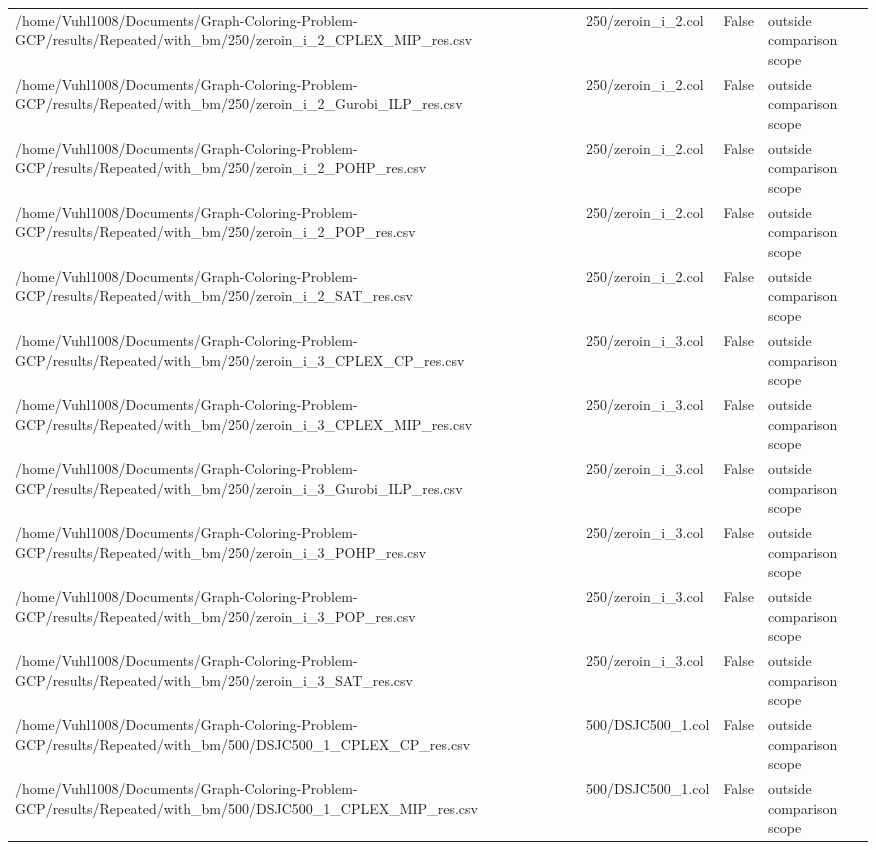\begin{table}[htbp]
\begin{tabular}{llll}
/home/Vuhl1008/Documents/Graph-Coloring-Problem-GCP/results/Repeated/with\_bm/250/zeroin\_i\_2\_CPLEX\_MIP\_res.csv & 250/zeroin\_i\_2.col & False & outside comparison scope \\
/home/Vuhl1008/Documents/Graph-Coloring-Problem-GCP/results/Repeated/with\_bm/250/zeroin\_i\_2\_Gurobi\_ILP\_res.csv & 250/zeroin\_i\_2.col & False & outside comparison scope \\
/home/Vuhl1008/Documents/Graph-Coloring-Problem-GCP/results/Repeated/with\_bm/250/zeroin\_i\_2\_POHP\_res.csv & 250/zeroin\_i\_2.col & False & outside comparison scope \\
/home/Vuhl1008/Documents/Graph-Coloring-Problem-GCP/results/Repeated/with\_bm/250/zeroin\_i\_2\_POP\_res.csv & 250/zeroin\_i\_2.col & False & outside comparison scope \\
/home/Vuhl1008/Documents/Graph-Coloring-Problem-GCP/results/Repeated/with\_bm/250/zeroin\_i\_2\_SAT\_res.csv & 250/zeroin\_i\_2.col & False & outside comparison scope \\
/home/Vuhl1008/Documents/Graph-Coloring-Problem-GCP/results/Repeated/with\_bm/250/zeroin\_i\_3\_CPLEX\_CP\_res.csv & 250/zeroin\_i\_3.col & False & outside comparison scope \\
/home/Vuhl1008/Documents/Graph-Coloring-Problem-GCP/results/Repeated/with\_bm/250/zeroin\_i\_3\_CPLEX\_MIP\_res.csv & 250/zeroin\_i\_3.col & False & outside comparison scope \\
/home/Vuhl1008/Documents/Graph-Coloring-Problem-GCP/results/Repeated/with\_bm/250/zeroin\_i\_3\_Gurobi\_ILP\_res.csv & 250/zeroin\_i\_3.col & False & outside comparison scope \\
/home/Vuhl1008/Documents/Graph-Coloring-Problem-GCP/results/Repeated/with\_bm/250/zeroin\_i\_3\_POHP\_res.csv & 250/zeroin\_i\_3.col & False & outside comparison scope \\
/home/Vuhl1008/Documents/Graph-Coloring-Problem-GCP/results/Repeated/with\_bm/250/zeroin\_i\_3\_POP\_res.csv & 250/zeroin\_i\_3.col & False & outside comparison scope \\
/home/Vuhl1008/Documents/Graph-Coloring-Problem-GCP/results/Repeated/with\_bm/250/zeroin\_i\_3\_SAT\_res.csv & 250/zeroin\_i\_3.col & False & outside comparison scope \\
/home/Vuhl1008/Documents/Graph-Coloring-Problem-GCP/results/Repeated/with\_bm/500/DSJC500\_1\_CPLEX\_CP\_res.csv & 500/DSJC500\_1.col & False & outside comparison scope \\
/home/Vuhl1008/Documents/Graph-Coloring-Problem-GCP/results/Repeated/with\_bm/500/DSJC500\_1\_CPLEX\_MIP\_res.csv & 500/DSJC500\_1.col & False & outside comparison scope \\

\end{tabular}
\end{table}
